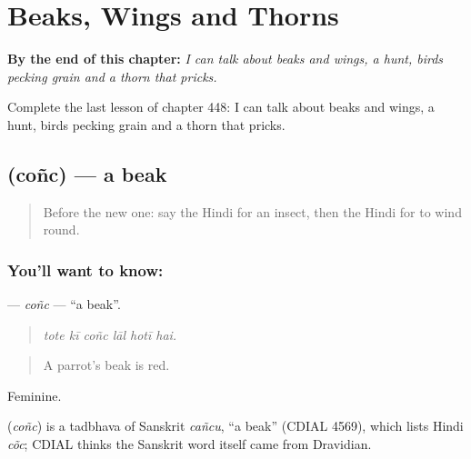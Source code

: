 
\chapter{Beaks, Wings and Thorns}
\label{ch:hi-beaks-wings-and-thorns}

\begin{chapteropening}
\textbf{By the end of this chapter:} \emph{I can talk about beaks and wings, a hunt, birds pecking grain and a thorn that pricks.}

Complete the last lesson of chapter 448: I can talk about beaks and wings, a hunt, birds pecking grain and a thorn that pricks.
\end{chapteropening}

\section[\texorpdfstring{\hi{चोंच} (coñc)}{चोंच (coñc)}]{ (coñc) — a beak}

\label{lesson:HI-C448-conc}



\begin{quote}
Before the new one: say the Hindi for an insect, then the Hindi for to wind round.
\end{quote}

\subsection*{You'll want to know: }
\textbf{} — \emph{coñc} — \textquotedblleft{}a beak\textquotedblright{}.

\begin{quote}
     
\end{quote}

\begin{quote}
\emph{tote kī coñc lāl hotī hai.}
\end{quote}

\begin{quote}
A parrot's beak is red.
\end{quote}

Feminine.

\begin{cousinweb}
\textbf{} (\emph{coñc}) is a tadbhava of Sanskrit \emph{cañcu}, \textquotedblleft{}a beak\textquotedblright{} (CDIAL 4569), which lists Hindi \emph{cõc}; CDIAL thinks the Sanskrit word itself came from Dravidian.
\end{cousinweb}

